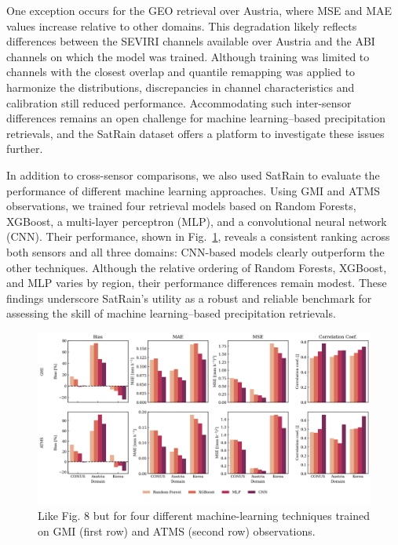 \documentclass[11pt]{article}
\begin{document}
One exception occurs for the GEO retrieval over Austria, where MSE and MAE
values increase relative to other domains. This degradation likely reflects
differences between the SEVIRI channels available over Austria and the ABI
channels on which the model was trained. Although training was limited to
channels with the closest overlap and quantile remapping was applied to
harmonize the distributions, discrepancies in channel characteristics and
calibration still reduced performance. Accommodating such inter-sensor
differences remains an open challenge for machine learning–based precipitation
retrievals, and the SatRain dataset offers a platform to investigate these
issues further.

In addition to cross-sensor comparisons, we also used SatRain to evaluate the
performance of different machine learning approaches. Using GMI and ATMS
observations, we trained four retrieval models based on Random Forests, XGBoost,
a multi-layer perceptron (MLP), and a convolutional neural network (CNN). Their
performance, shown in Fig.~\ref{fig:sensor_comparison}, reveals a consistent
ranking across both sensors and all three domains: CNN-based models clearly
outperform the other techniques. Although the relative ordering of Random
Forests, XGBoost, and MLP varies by region, their performance differences remain
modest. These findings underscore SatRain’s utility as a robust and reliable
benchmark for assessing the skill of machine learning–based precipitation
retrievals.

\begin{figure}[htbp]
	\centering
	\includegraphics[width=1.0\textwidth]{figures/fig11}
	\caption{
		Like Fig. 8 but for four different machine-learning techniques trained on GMI (first row)
		and ATMS (second row) observations.
	}
	\label{fig:sensor_comparison}
\end{figure}
\end{document}
